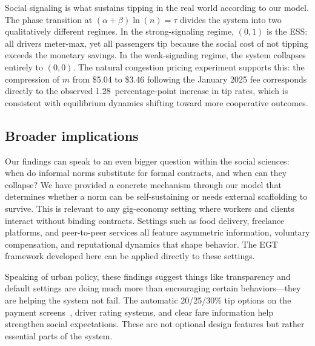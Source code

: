 \documentclass[pdflatex,sn-mathphys-num]{sn-jnl}%
\theoremstyle{thmstyleone}%
\theoremstyle{thmstyletwo}%
\theoremstyle{thmstylethree}%
\begin{document}
Social signaling is what sustains tipping in the real world according to our model. The phase transition at $(\alpha+\beta)\ln(n) = \tau$ divides the system into two qualitatively different regimes. In the strong-signaling regime, $(0, 1)$ is the ESS: all drivers meter-max, yet all passengers tip because the social cost of not tipping exceeds the monetary savings. In the weak-signaling regime, the system collapses entirely to $(0, 0)$. The natural congestion pricing experiment supports this: the compression of $m$ from \$5.04 to \$3.46 following the January 2025 fee corresponds directly to the observed 1.28~percentage-point increase in tip rates, which is consistent with equilibrium dynamics shifting toward more cooperative outcomes.

\subsection{Broader implications}\label{sec:broader}
Our findings can speak to an even bigger question within the social sciences: when do informal norms substitute for formal contracts, and when can they collapse? We have provided a concrete mechanism through our model that determines whether a norm can be self-sustaining or needs external scaffolding to survive. This is relevant to any gig-economy setting where workers and clients interact without binding contracts. Settings such as food delivery, freelance platforms, and peer-to-peer services all feature asymmetric information, voluntary compensation, and reputational dynamics that shape behavior. The EGT framework developed here can be applied directly to these settings.

Speaking of urban policy, these findings suggest things like transparency and default settings are doing much more than encouraging certain behaviors---they are helping the system not fail. The automatic 20/25/30\% tip options on the payment screens~\cite{haggag2014}, driver rating systems, and clear fare information help strengthen social expectations. These are not optional design features but rather essential parts of the system.
\end{document}
